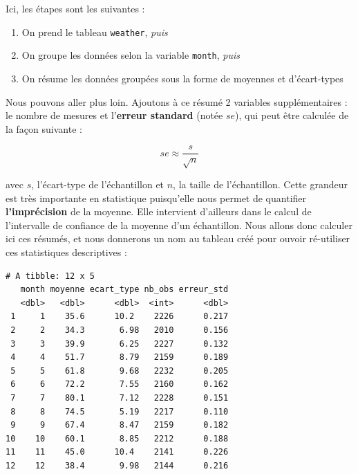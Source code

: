 \documentclass[a4paperpaper,]{article}
\newenvironment{Shaded}{\begin{snugshade}}{\end{snugshade}}
\newcommand{\KeywordTok}[1]{\textcolor[rgb]{0.13,0.29,0.53}{\textbf{#1}}}
\newcommand{\DataTypeTok}[1]{\textcolor[rgb]{0.13,0.29,0.53}{#1}}
\newcommand{\StringTok}[1]{\textcolor[rgb]{0.31,0.60,0.02}{#1}}
\newcommand{\OtherTok}[1]{\textcolor[rgb]{0.56,0.35,0.01}{#1}}
\newcommand{\OperatorTok}[1]{\textcolor[rgb]{0.81,0.36,0.00}{\textbf{#1}}}
\newcommand{\NormalTok}[1]{#1}
\providecommand{\tightlist}{%
  \setlength{\itemsep}{0pt}\setlength{\parskip}{0pt}}
\theoremstyle{definition}
\theoremstyle{definition}
\theoremstyle{definition}
\theoremstyle{remark}
\begin{document}
Ici, les étapes sont les suivantes :

\begin{enumerate}
\def\labelenumi{\arabic{enumi}.}
\tightlist
\item
  On prend le tableau \texttt{weather}, \emph{puis}
\item
  On groupe les données selon la variable \texttt{month}, \emph{puis}
\item
  On résume les données groupées sous la forme de moyennes et
  d'écart-types
\end{enumerate}

Nous pouvons aller plus loin. Ajoutons à ce résumé 2 variables
supplémentaires : le nombre de mesures et l'\textbf{erreur standard}
(notée \(se\)), qui peut être calculée de la façon suivante :

\[se \approx \frac{s}{\sqrt{n}}\]

avec \(s\), l'écart-type de l'échantillon et \(n\), la taille de
l'échantillon. Cette grandeur est très importante en statistique
puisqu'elle nous permet de quantifier \textbf{l'imprécision} de la
moyenne. Elle intervient d'ailleurs dans le calcul de l'intervalle de
confiance de la moyenne d'un échantillon. Nous allons donc calculer ici
ces résumés, et nous donnerons un nom au tableau créé pour ouvoir
ré-utiliser ces statistiques descriptives :

\begin{Shaded}
\end{Shaded}

\begin{verbatim}
# A tibble: 12 x 5
   month moyenne ecart_type nb_obs erreur_std
   <dbl>   <dbl>      <dbl>  <int>      <dbl>
 1     1    35.6      10.2    2226      0.217
 2     2    34.3       6.98   2010      0.156
 3     3    39.9       6.25   2227      0.132
 4     4    51.7       8.79   2159      0.189
 5     5    61.8       9.68   2232      0.205
 6     6    72.2       7.55   2160      0.162
 7     7    80.1       7.12   2228      0.151
 8     8    74.5       5.19   2217      0.110
 9     9    67.4       8.47   2159      0.182
10    10    60.1       8.85   2212      0.188
11    11    45.0      10.4    2141      0.226
12    12    38.4       9.98   2144      0.216
\end{verbatim}
\end{document}
